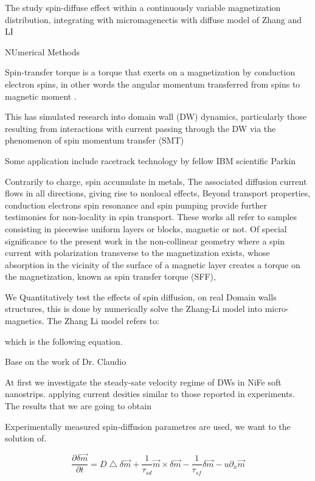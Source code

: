 The study spin-diffuse effect within a continuously variable magnetization distribution, integrating with micromagenectis with diffuse model of Zhang and LI \cite{claudio}


NUmerical Methods
\cite{methods}


Spin-transfer torque is a torque that exerts on a magnetization by conduction electron spins, in other words the angular momentum transferred from spins to magnetic  moment \cite{zhang}.

This has simulated research into domain wall (DW) dynamics, particularly those resulting from interactions with current passing through the DW via the phenomenon of spin momentum transfer (SMT) \cite{handbookspin}

Some application include racetrack technology by fellow IBM scientific Parkin \cite{racetrack}



Contrarily to charge, spin accumulate in metals, The associated diffusion current flows in all directions, giving rise to nonlocal effects, Beyond transport properties, conduction electrons spin resonance and spin pumping provide further testimonies for non-locality in spin transport. These works all refer  to samples consisting in piecewise uniform layers or blocks, magnetic or not. Of special significance to the present work in the non-collinear geometry where a spin current with polarization transverse to the magnetization exists, whose absorption in the vicinity of the surface of a magnetic layer creates a torque on the magnetization, known as spin transfer torque (SFF), 



We Quantitatively test the effects of spin diffusion, on real Domain walls structures, this is done by numerically solve the Zhang-Li model \cite{zhang} into micro-magnetics.
The Zhang Li model refers to:

which is the following equation.

Base on the work of Dr. Claudio \cite{claudio}

At first we investigate the steady-sate velocity regime of DWs in NiFe soft nanostrips. applying current desities similar to those reported in experiments. The results that we are going to obtain 

Experimentally measured spin-diffusion parametres are used, we want to the solution of. 

\begin{equation}
 \frac{\partial \delta \vec{m} }{\partial t} =  D\bigtriangleup \delta \vec{m} + \frac{1}{\tau_{sd}} \vec{m} \times \delta  \vec{m} - \frac{1}{\tau_{sf}}\delta \vec{m} - u \partial_{x}  \vec{m}
\end{equation}


